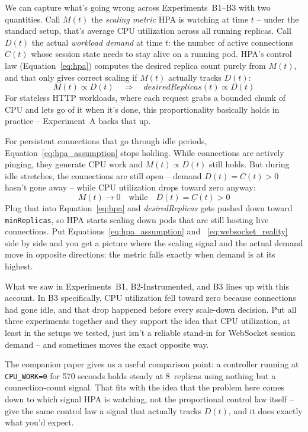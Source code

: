 \documentclass[twocolumn]{svjour3}
\begin{document}
We can capture what's going wrong across Experiments~B1--B3 with two quantities.
Call $M(t)$ the \textit{scaling metric} HPA is watching at time $t$ -- under the
standard setup, that's average CPU utilization across all running replicas. Call
$D(t)$ the actual \textit{workload demand} at time $t$: the number of active
connections $C(t)$ whose session state needs to stay alive on a running pod. HPA's
control law (Equation~\ref{eq:hpa}) computes the desired replica count purely from
$M(t)$, and that only gives correct scaling if $M(t)$ actually tracks $D(t)$:
\begin{equation}
M(t) \propto D(t) \quad \Longrightarrow \quad
\textit{desiredReplicas}(t) \propto D(t)
\label{eq:hpa_assumption}
\end{equation}
For stateless HTTP workloads, where each request grabs a bounded chunk of CPU and
lets go of it when it's done, this proportionality basically holds in practice --
Experiment~A backs that up.

For persistent connections that go through idle periods, Equation~\ref{eq:hpa_assumption}
stops holding. While connections are actively pinging, they generate CPU work and
$M(t) \propto D(t)$ still holds. But during idle stretches, the connections are
still open -- demand $D(t) = C(t) > 0$ hasn't gone away -- while CPU utilization
drops toward zero anyway:
\begin{equation}
M(t) \to 0 \quad \text{while} \quad D(t) = C(t) > 0
\label{eq:websocket_reality}
\end{equation}
Plug that into Equation~\ref{eq:hpa} and \textit{desiredReplicas} gets pushed down
toward \texttt{minReplicas}, so HPA starts scaling down pods that are still hosting
live connections. Put Equations~\ref{eq:hpa_assumption} and
~\ref{eq:websocket_reality} side by side and you get a picture where the scaling
signal and the actual demand move in opposite directions: the metric falls exactly
when demand is at its highest.

What we saw in Experiments~B1, B2-Instrumented, and B3 lines up with this account.
In B3 specifically, CPU utilization fell toward zero because connections had gone
idle, and that drop happened before every scale-down decision. Put all three
experiments together and they support the idea that CPU utilization, at least in
the setups we tested, just isn't a reliable stand-in for WebSocket session demand
-- and sometimes moves the exact opposite way.

The companion paper gives us a useful comparison point: a controller running at
\texttt{CPU\_WORK=0} for 570 seconds holds steady at 8~replicas using nothing but a
connection-count signal. That fits with the idea that the problem here comes down
to which signal HPA is watching, not the proportional control law itself -- give
the same control law a signal that actually tracks $D(t)$, and it does exactly what
you'd expect.
\end{document}
